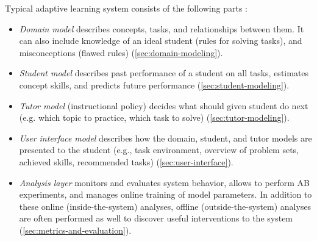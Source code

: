 \smallskip
Typical adaptive learning system consists of the following parts %
\cite{its-learner-models}:
\begin{itemize}
\item \emph{Domain model}
  describes concepts, tasks, and relationships between them.
  It can also include knowledge of an ideal student (rules for solving tasks),
  and misconceptions (flawed rules)
  (\cref{sec:domain-modeling}).
\item \emph{Student model} %
  describes past performance of a student on all tasks,
  estimates concept skills,
  and predicts future performance
  (\cref{sec:student-modeling}).
\item \emph{Tutor model}
  (instructional policy)
  decides what should given student do next
  (e.g. which topic to practice, which task to solve)
  (\cref{sec:tutor-modeling}).
\item \emph{User interface model} %
  describes how the domain, student, and tutor models are presented to
  the student (e.g., task environment, overview of problem sets, achieved
  skills, recommended tasks)
  (\cref{sec:user-interface}).
\item \emph{Analysis layer}
  monitors and evaluates system behavior,
  allows to perform AB experiments,
  and manages online training of model parameters.
  In addition to these online (inside-the-system) analyses,
  offline (outside-the-system) analyses are often performed as well
  to discover useful interventions to the system  %
  (\cref{sec:metrics-and-evaluation}).
\end{itemize}



